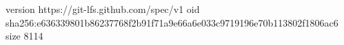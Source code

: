 version https://git-lfs.github.com/spec/v1
oid sha256:e636339801b86237768f2b91f71a9e66a6e033c9719196e70b113802f1806ac6
size 8114
